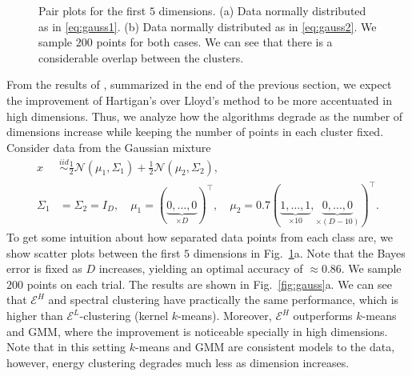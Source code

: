 \documentclass[aps,preprint,nofootinbib,floatfix]{revtex4-1}
\begin{document}
\begin{figure}
\begin{minipage}{0.49\textwidth}
\end{minipage}
\caption{
\label{fig:pairsplot}
Pair plots for the first $5$ dimensions. (a) Data normally distributed
as in \eqref{eq:gauss1}. (b) Data normally distributed as in 
\eqref{eq:gauss2}. We sample $200$ points for both cases.
We can see that there is a considerable overlap between the clusters.
}
\end{figure} 

From the results of \cite{Telgarsky}, summarized in the end of the previous
section, we expect the improvement of Hartigan's 
over Lloyd's method to be more accentuated in high dimensions.
Thus, we analyze
how the algorithms degrade as the number of dimensions increase while
keeping the number of points in each cluster fixed.
Consider data from the Gaussian mixture
\begin{equation}
\label{eq:gauss1}
\begin{split}
x  &\stackrel{iid}{\sim} 
\tfrac{1}{2} \mathcal{N}(\mu_1,\Sigma_1) +
\tfrac{1}{2} \mathcal{N}(\mu_2,\Sigma_2), \\
\Sigma_1&=\Sigma_2 = I_D, \quad
\mu_1 = (\underbrace{0,\dotsc,0}_{\times D})^\top, \quad
\mu_2 = 0.7 (\underbrace{1,\dots,1}_{\times 10},
\underbrace{0,\dots,0}_{\times (D-10)})^\top.
\end{split}
\end{equation}
To get some intuition about how separated data points from each class
are, we show scatter plots between the first $5$ dimensions in 
Fig.~\ref{fig:pairsplot}a.
Note that the Bayes error
is fixed as $D$ increases, yielding an optimal 
accuracy of $\approx 0.86$.
We sample $200$ points on each trial.
The results are shown in Fig.~\ref{fig:gauss}a. We can see that
$\mathcal{E}^H$ and spectral clustering have practically
the same performance, which is 
higher than $\mathcal{E}^L$-clustering (kernel
$k$-means). Moreover, $\mathcal{E}^H$ outperforms 
$k$-means and GMM, where the improvement is noticeable specially in 
high dimensions.
Note that in this setting $k$-means and GMM are consistent models to the data,
however, energy clustering degrades much less as dimension increases.
\end{document}
